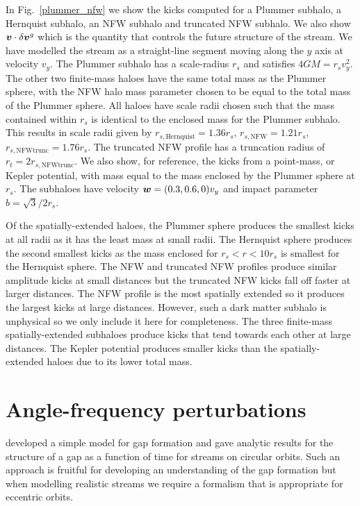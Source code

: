 \documentclass[useAMS,usenatbib,fleqn,a4paper]{mn2e}
\newcommand{\bs}[1]{\bmath{#1}}
\begin{document}
In Fig.~\ref{plummer_nfw} we show the kicks computed for a Plummer subhalo, a Hernquist subhalo, an NFW subhalo and truncated NFW subhalo. We also show $\bs{v}\cdot\delta\bs{v}^g$ which is the quantity that controls the future structure of the stream. We have modelled the stream as a straight-line segment moving along the $y$ axis at velocity $v_y$. The Plummer subhalo has a scale-radius $r_s$ and satisfies $4GM=r_sv_y^2$. The other two finite-mass haloes have the same total mass as the Plummer sphere, with the NFW halo mass parameter chosen to be equal to the total mass of the Plummer sphere. All haloes have scale radii chosen such that the mass contained within $r_s$ is identical to the enclosed mass for the Plummer subhalo. This results in scale radii given by $r_{s,\mathrm{Hernquist}}=1.36r_s$, $r_{s,\mathrm{NFW}}=1.21r_s$, $r_{s,\mathrm{NFW trunc}}=1.76r_s$. The truncated NFW profile has a truncation radius of $r_t=2r_{s,\mathrm{NFW trunc}}$. We also show, for reference, the kicks from a point-mass, or Kepler potential, with mass equal to the mass enclosed by the Plummer sphere at $r_s$. The subhaloes have velocity $\bs{w}=(0.3,0.6,0)v_y$ and impact parameter $b=\sqrt{3}/2r_s$.

Of the spatially-extended haloes, the Plummer sphere produces the smallest kicks at all radii as it has the least mass at small radii. The Hernquist sphere produces the second smallest kicks as the mass enclosed for $r_s<r<10r_s$ is smallest for the Hernquist sphere. The NFW and truncated NFW profiles produce similar amplitude kicks at small distances but the truncated NFW kicks fall off faster at larger distances. The NFW profile is the most spatially extended so it produces the largest kicks at large distances. However, such a dark matter subhalo is unphysical so we only include it here for completeness. The three finite-mass spatially-extended subhaloes produce kicks that tend towards each other at large distances. The Kepler potential produces smaller kicks than the spatially-extended haloes due to its lower total mass.

\section{Angle-frequency perturbations}\label{Sec::Formalism_angfreq}
\cite{ErkalBelokurov2015} developed a simple model for gap formation and gave analytic results for the structure of a gap as a function of time for streams on circular orbits. Such an approach is fruitful for developing an understanding of the gap formation but when modelling realistic streams we require a formalism that is appropriate for eccentric orbits.
\end{document}
